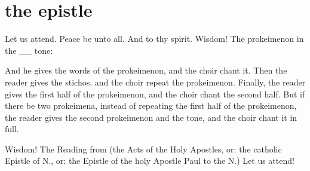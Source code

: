 \section{the epistle}

\begin{liturgicaltext}
    \deacon Let us attend.
    \priest Peace be unto all.
    \reader And to thy spirit.
    \deacon Wisdom!
    \reader The prokeimenon in the \_\_ tone:
\end{liturgicaltext}
\begin{rubricmed}
    And he gives the words of the prokeimenon, and the choir chant it. Then the reader gives the stichos, and the choir repeat the prokeimenon. Finally, the reader gives the first half of the prokeimenon, and the choir chant the second half. But if there be two prokeimena, instead of repeating the first half of the prokeimenon, the reader gives the second prokeimenon and the tone, and the choir chant it in full.
\end{rubricmed}
\begin{liturgicaltext}
    \deacon Wisdom!
    \reader The Reading from (the Acts of the Holy Apostles, or: the catholic Epistle of N., or: the Epistle of the holy Apostle Paul to the N.)
    \deacon Let us attend!
    \reader {}
\end{liturgicaltext}

